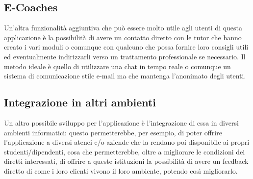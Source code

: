 \subsection{E-Coaches}
Un'altra funzionalità aggiuntiva che può essere molto utile agli utenti di questa applicazione è la possibilità di avere un contatto diretto con le tutor che hanno creato i vari moduli o comunque con qualcuno che possa fornire loro consigli utili ed eventualmente indirizzarli verso un trattamento professionale se necessario. Il metodo ideale è quello di utilizzare una chat in tempo reale o comunque un sistema di comunicazione stile e-mail ma che mantenga l'anonimato degli utenti.

\subsection{Integrazione in altri ambienti}
Un altro possibile sviluppo per l'applicazione è l'integrazione di essa in diversi ambienti informatici: questo permetterebbe, per esempio, di poter offrire l'applicazione a diversi atenei e/o aziende che la rendano poi disponibile ai propri studenti/dipendenti, cosa che permetterebbe, oltre a migliorare le condizioni dei diretti interessati, di offrire a queste istituzioni la possibilità di avere un feedback diretto di come i loro clienti vivono il loro ambiente, potendo così migliorarlo.
\newpage\null\thispagestyle{empty}\newpage